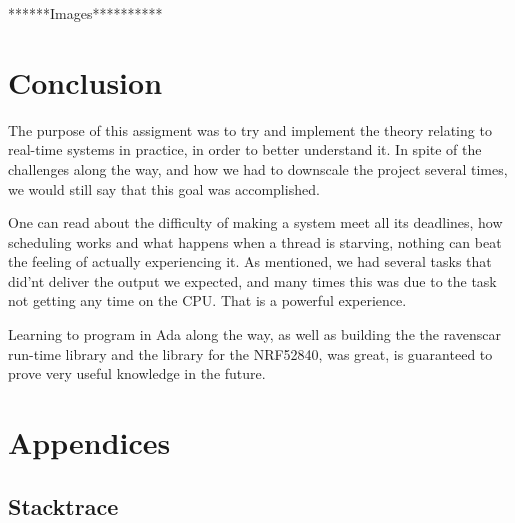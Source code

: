 \documentclass{article}
\begin{document}
******Images**********
\section{Conclusion}

The purpose of this assigment was to try and implement the theory relating to real-time systems in practice, in order to better understand it. In spite of the challenges along the way, and how we had to downscale the project several times, we would still say that this goal was accomplished.

One can read about the difficulty of making a system meet all its deadlines, how scheduling works and what happens when a thread is starving, nothing can beat the feeling of actually experiencing it. As mentioned, we had several tasks that did'nt deliver the output we expected, and many times this was due to the task not getting any time on the CPU. That is a powerful experience. 

Learning to program in Ada along the way, as well as building the the ravenscar run-time library and the library for the NRF52840, was great, is guaranteed to prove very useful knowledge in the future. 


\newpage
\nocite{*}



\newpage
\section{Appendices}

\subsection{Stacktrace}




\end{document}
